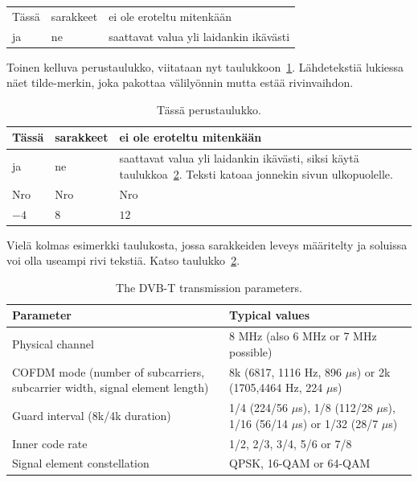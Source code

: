\begin{tabular}{|l|l|l|} 
\hline
Tässä & sarakkeet & ei ole eroteltu mitenkään \\
ja    & ne        & saattavat valua yli laidankin ikävästi \\
\hline
\end{tabular}

Toinen kelluva perustaulukko, viitataan nyt taulukkoon~\ref{table:perustaulu}.
Lähdetekstiä lukiessa näet tilde-merkin, joka pakottaa välilyönnin
mutta estää rivinvaihdon.

\begin{table}[ht]
\caption{Tässä perustaulukko.}
\label{table:perustaulu}
\begin{center}
\begin{tabular}{|l|l|l|} 
\hline
Tässä & sarakkeet & ei ole eroteltu mitenkään \\
\hline
ja    & ne        & saattavat valua yli laidankin ikävästi, %
                   siksi käytä taulukkoa~\ref{table:dvbt_param}. %
                   Teksti katoaa jonnekin sivun ulkopuolelle. \\
\hline
Nro   & Nro       & Nro \\
\hline
$-4$  & $8$       & $12$ \\
\hline
\end{tabular}
\end{center}
\end{table}

Vielä kolmas esimerkki taulukosta, jossa sarakkeiden leveys määritelty
ja soluissa voi olla useampi rivi tekstiä. Katso
taulukko~\ref{table:dvbt_param}.

\begin{table}[th]
\caption{The DVB-T transmission parameters.}
\label{table:dvbt_param}
\begin{center}
\begin{tabular}{|p{}|p{}|} 
    \hline
Parameter & Typical values \\
    \hline
    \hline
Physical channel&8 MHz (also 6 MHz or 7 MHz possible)\\ 
    \hline
COFDM mode (number of subcarriers, 
subcarrier width, 
signal element length)
&8k (6817, 1116 Hz, 896 $\mu$s) or 
2k (1705,4464 Hz, 224 $\mu$s)\\
    \hline
Guard interval (8k/4k duration)
&1/4 (224/56 $\mu$s), 1/8 (112/28 $\mu$s),
   1/16 (56/14 $\mu$s) or 1/32 (28/7 $\mu$s)\\
    \hline
Inner code rate &1/2, 2/3, 3/4, 5/6 or 7/8\\
    \hline
Signal  element constellation 
&QPSK, 16-QAM or 64-QAM \\
    \hline
\end{tabular}
\end{center}
\end{table}


